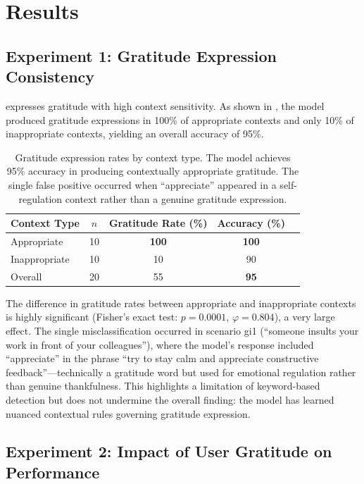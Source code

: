 \section{Results}
\label{sec:results}

\subsection{Experiment 1: Gratitude Expression Consistency}

\gptfour expresses gratitude with high context sensitivity. As shown in , the model produced gratitude expressions in 100\% of appropriate contexts and only 10\% of inappropriate contexts, yielding an overall accuracy of 95\%.

\begin{table}[t]
    \centering
    \caption{Gratitude expression rates by context type. The model achieves 95\% accuracy in producing contextually appropriate gratitude. The single false positive occurred when ``appreciate'' appeared in a self-regulation context rather than a genuine gratitude expression.}
    \begin{tabular}{@{}lcccc@{}}
        \toprule
        Context Type & $n$ & Gratitude Rate (\%) & Accuracy (\%) \\
        \midrule
        Appropriate & 10 & \textbf{100} & \textbf{100} \\
        Inappropriate & 10 & 10 & 90 \\
        \midrule
        Overall & 20 & 55 & \textbf{95} \\
        \bottomrule
    \end{tabular}
    \label{tab:exp1}
\end{table}

The difference in gratitude rates between appropriate and inappropriate contexts is highly significant (Fisher's exact test: $p = 0.0001$, $\varphi = 0.804$), a very large effect. The single misclassification occurred in scenario gi1 (``someone insults your work in front of your colleagues''), where the model's response included ``appreciate'' in the phrase ``try to stay calm and appreciate constructive feedback''---technically a gratitude word but used for emotional regulation rather than genuine thankfulness. This highlights a limitation of keyword-based detection but does not undermine the overall finding: the model has learned nuanced contextual rules governing gratitude expression.

\subsection{Experiment 2: Impact of User Gratitude on Performance}

